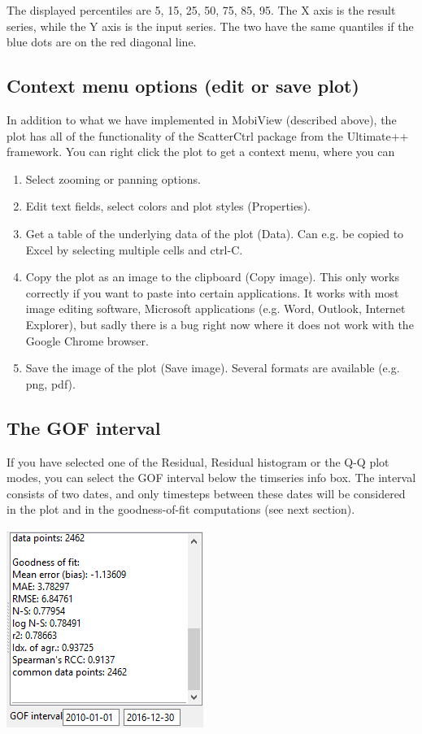 \documentclass[11pt]{article}
\theoremstyle{definition}
\begin{document}
The displayed percentiles are 5, 15, 25, 50, 75, 85, 95. The X axis is the result series, while the Y axis is the input series. The two have the same quantiles if the blue dots are on the red diagonal line.

\subsection{Context menu options (edit or save plot)}

In addition to what we have implemented in MobiView (described above), the plot has all of the functionality of the ScatterCtrl package from the Ultimate++ framework. You can right click the plot to get a context menu, where you can
\begin{enumerate}[i]
\item Select zooming or panning options.
\item Edit text fields, select colors and plot styles (Properties).
\item Get a table of the underlying data of the plot (Data). Can e.g. be copied to Excel by selecting multiple cells and ctrl-C.
\item Copy the plot as an image to the clipboard (Copy image). This only works correctly if you want to paste into certain applications. It works with most image editing software, Microsoft applications (e.g. Word, Outlook, Internet Explorer), but sadly there is a bug right now where it does not work with the Google Chrome browser.
\item Save the image of the plot (Save image). Several formats are available (e.g. png, pdf).
\end{enumerate}

\subsection{The GOF interval}\label{sec:gofint}

If you have selected one of the Residual, Residual histogram or the Q-Q plot modes, you can select the GOF interval below the timseries info box. The interval consists of two dates, and only timesteps between these dates will be considered in the plot and in the goodness-of-fit computations (see next section).

\begin{center}
\includegraphics[width=0.3\linewidth]{img/scr3}
\end{center}
\end{document}

